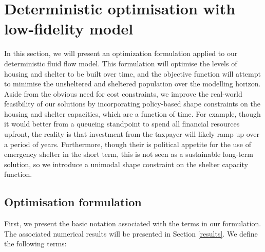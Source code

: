 \documentclass[12pt,a4paper]{article}
\begin{document}
\section{Deterministic optimisation with low-fidelity model} \label{do}
%
In this section, we will present an optimization formulation applied to our deterministic fluid flow model. This formulation will optimise the levels of housing and shelter to be built over time, and the objective function will attempt to minimise the unsheltered and sheltered population over the modelling horizon. Aside from the obvious need for cost constraints, we improve the real-world feasibility of our solutions by incorporating policy-based shape constraints on the housing and shelter capacities, which are a function of time. For example, though it would better from a queueing standpoint to spend all financial resources upfront, the reality is that investment from the taxpayer will likely ramp up over a period of years. Furthermore, though their is political appetite for the use of emergency shelter in the short term, this is not seen as a sustainable long-term solution, so we introduce a unimodal shape constraint on the shelter capacity function.
%
\subsection{Optimisation formulation} \label{opt}
%
First, we present the basic notation associated with the terms in our formulation. The associated numerical results will be presented in Section \ref{results}. We define the following terms:
\end{document}
